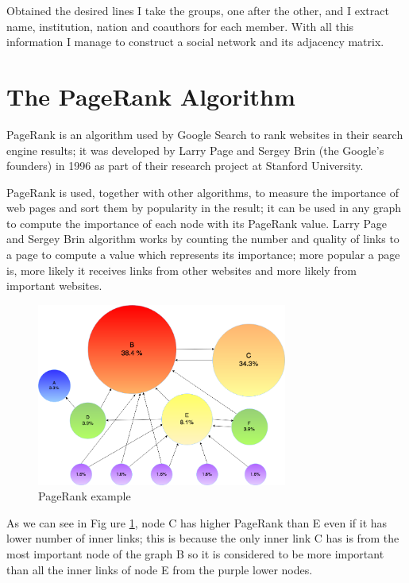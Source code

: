\documentclass[]{usiinfbachelorproject}
\begin{document}
Obtained the desired lines I take the groups, one after the other, and I extract name, institution, nation and coauthors for each member. With all this information I manage to construct a social network and its adjacency matrix.






\section{The PageRank Algorithm} \label{sec:pagerank} 
PageRank is an algorithm used by Google Search to rank websites in their search engine results; it was developed by  Larry Page and  Sergey Brin (the Google's founders) in 1996 as part of their research project at Stanford University.

PageRank is used, together with other algorithms, to measure the importance of web pages and sort them by popularity in the result; it can be used in any graph to compute the importance of each node with its PageRank value. Larry Page and  Sergey Brin algorithm works by counting the number and quality of links to a page to compute a value which represents its importance; more popular a page is, more likely it receives links from other websites and more likely from important websites.

\begin{figure}[ht]
	\centering
	\includegraphics[height=6cm]{img/page_rank_example.png}
	\caption{PageRank example}
	\label{fig:prexample}
\end{figure}

As we can see in Fig ure \ref{fig:prexample}, node C has higher PageRank than E even if it has lower number of inner links; this is because the only inner link C has is from the most important node of the graph B so it is considered to be more important than all the inner links of node E from the purple lower nodes.
\end{document}
